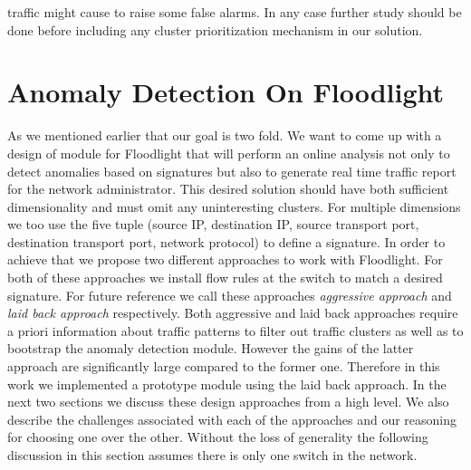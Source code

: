 \documentclass[twocolumn]{article}
\begin{document}
traffic might cause to raise some false alarms. In any case further study should be done before including any cluster prioritization mechanism in our solution.


\section{Anomaly Detection On Floodlight}
\label{sec:adonfloodlight}
As we mentioned earlier that our goal is two fold. We want to come up with a design of module for Floodlight that will perform an online analysis not only to detect anomalies based on signatures but also to generate real time traffic report for the network administrator. This desired solution should have both sufficient dimensionality and must omit any uninteresting clusters. For multiple dimensions we too use the five tuple (source IP, destination IP, source transport port, destination transport port, network protocol) to define a signature. In order to achieve that we propose two different approaches to work with Floodlight. For both of these approaches we install flow rules at the switch to match a desired signature. For future reference we call these approaches \emph{aggressive approach} and \emph{laid back approach} respectively. Both aggressive and laid back approaches require a priori information about traffic patterns to filter out traffic clusters as well as to bootstrap the anomaly detection module. However the gains of the latter approach are significantly large compared to the former one. Therefore in this work we implemented a prototype module using the laid back approach. In the next two sections we discuss these design approaches from a high level. We also describe the challenges associated with each of the approaches and our reasoning for choosing one over the other. Without the loss of generality the following discussion in this section assumes there is only one switch in the network. 
\end{document}
